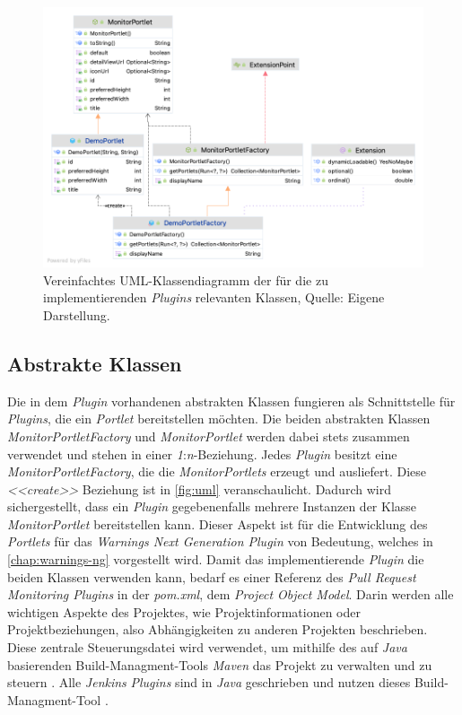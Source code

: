 \begin{figure}[H]
\centering
\includegraphics[width=\textwidth]{source/images/uml-with-methods}
\caption[Vereinfachtes UML-Klassendiagramm der für die zu implementierenden \textit{Plugins} relevanten Klassen.]{Vereinfachtes UML-Klassendiagramm der für die zu implementierenden \textit{Plugins} relevanten Klassen, Quelle: Eigene Darstellung.}
\label{fig:uml}
\end{figure}

\subsection{Abstrakte Klassen}
\label{chap:abstractClass}
Die in dem \textit{Plugin} vorhandenen abstrakten Klassen fungieren als Schnittstelle für \textit{Plugins}, die ein \textit{Portlet} bereitstellen möchten. Die beiden abstrakten Klassen \textit{MonitorPortletFactory} und \textit{MonitorPortlet} werden dabei stets zusammen verwendet und stehen in einer \textit{1}:\textit{n}-Beziehung. Jedes \textit{Plugin} besitzt eine \textit{MonitorPortletFactory}, die die \textit{MonitorPortlets} erzeugt und ausliefert. Diese \textit{<<create>>} Beziehung ist in \autoref{fig:uml} veranschaulicht. 
Dadurch wird sichergestellt, dass ein \textit{Plugin} gegebenenfalls mehrere Instanzen der Klasse \textit{MonitorPortlet} bereitstellen kann. Dieser Aspekt ist für die Entwicklung des \textit{Portlets} für das \textit{Warnings Next Generation Plugin} von Bedeutung, welches in \autoref{chap:warnings-ng} vorgestellt wird. Damit das implementierende \textit{Plugin} die beiden Klassen verwenden kann, bedarf es einer Referenz des \textit{Pull Request Monitoring Plugins} in der \textit{pom.xml}, dem \textit{Project Object Model}. Darin werden alle wichtigen Aspekte des Projektes, wie Projektinformationen oder  Projektbeziehungen, also Abhängigkeiten zu anderen Projekten beschrieben. Diese zentrale Steuerungsdatei wird verwendet, um mithilfe des auf \textit{Java} basierenden Build-Managment-Tools \textit{Maven} das Projekt zu verwalten und zu steuern \citep{horn_maven}. Alle \textit{Jenkins} \textit{Plugins} sind in \textit{Java} geschrieben und nutzen dieses Build-Managment-Tool \citep{jenkinsci_plugin}.

